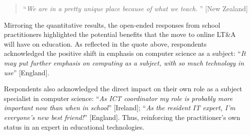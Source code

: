 \documentclass[conference]{IEEEtran}
\begin{document}
\begin{quotation}
``{\emph{We are in a pretty unique place because of what we
teach. }}'' [New Zealand]
\end{quotation}



Mirroring the quantitative results, the open-ended responses from
school practitioners highlighted the potential benefits that the move
to online LT\&A will have on education. As reflected in the quote
above, respondents acknowledged the positive shift in emphasis on
computer science as a subject: ``{\emph{It may put further emphasis on
    computing as a subject, with so much technology in use}}'' [England].

Respondents also acknowledged the direct impact on their own role as a
subject specialist in computer science: ``{\emph{As ICT coordinator my
role is probably more important now than when in school}}'' [Ireland];
``{\emph{As the resident IT expert, I’m everyone’s new best
friend!}}'' [England]. Thus, reinforcing the practitioner’s own status
in an expert in educational technologies. 

\end{document}
